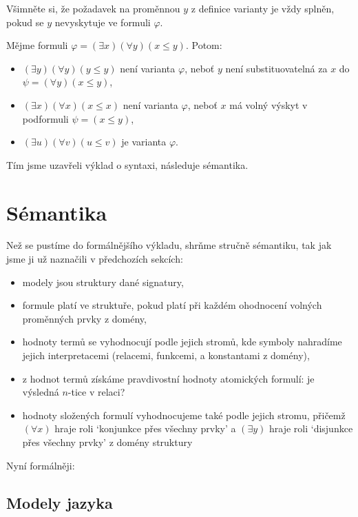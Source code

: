 Všimněte si, že požadavek na proměnnou $y$ z definice varianty je vždy splněn, pokud se $y$ nevyskytuje ve formuli $\varphi$.

\begin{example}
    Mějme formuli $\varphi=(\exists x)(\forall y)(x\leq y)$. Potom:
\begin{itemize}
    \item $(\exists y)(\forall y)(y\leq y)$ není varianta $\varphi$, neboť $y$ není substituovatelná za $x$ do $\psi=(\forall y)(x\leq y)$,
    \item $(\exists x)(\forall x)(x\leq x)$ není varianta $\varphi$, neboť $x$ má volný výskyt v podformuli $\psi=(x\leq y)$,
    \item $(\exists u)(\forall v)(u\leq v)$ je varianta $\varphi$.
\end{itemize}   
\end{example}

Tím jsme uzavřeli výklad o syntaxi, následuje sémantika.


\section{Sémantika}\label{section:predicate-semantics}

Než se pustíme do formálnějšího výkladu, shrňme stručně sémantiku, tak jak jsme ji už naznačili v předchozích sekcích: 

\begin{itemize}
    \item modely jsou struktury dané signatury,
    \item formule platí ve struktuře, pokud platí při každém ohodnocení volných proměnných prvky z domény,
    \item hodnoty termů se vyhodnocují podle jejich stromů, kde symboly nahradíme jejich interpretacemi (relacemi, funkcemi, a konstantami z domény),
    \item z hodnot termů získáme pravdivostní hodnoty atomických formulí: je výsledná $n$-tice v relaci?
    \item hodnoty složených formulí vyhodnocujeme také podle jejich stromu, přičemž $(\forall x)$ hraje roli `konjunkce přes všechny prvky' a  $(\exists y)$ hraje roli `disjunkce přes všechny prvky' z domény struktury
\end{itemize}

Nyní formálněji:

\subsection{Modely jazyka}


